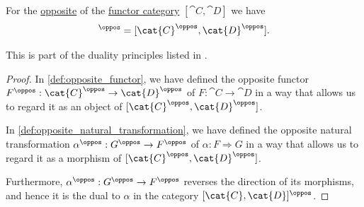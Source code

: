 \begin{proposition}\label{thm:opposite_of_functor_category}
  For the \hyperref[def:opposite_category]{opposite} of the \hyperref[def:functor_category]{functor category} \( [\cat{C}, \cat{D}] \) we have
  \begin{equation*}
    [\cat{C}, \cat{D}]^\oppos = [\cat{C}^\oppos, \cat{D}^\oppos].
  \end{equation*}

  This is part of the duality principles listed in .
\end{proposition}
\begin{proof}
  In \cref{def:opposite_functor}, we have defined the opposite functor \( F^\oppos: \cat{C}^\oppos \to \cat{D}^\oppos \) of \( F: \cat{C} \to \cat{D} \) in a way that allows us to regard it as an object of \( [\cat{C}^\oppos, \cat{D}^\oppos] \).

  In \cref{def:opposite_natural_transformation}, we have defined the opposite natural transformation \( \alpha^\oppos: G^\oppos \to F^\oppos \) of \( \alpha: F \Rightarrow G \) in a way that allows us to regard it as a morphism of \( [\cat{C}^\oppos, \cat{D}^\oppos] \).

  Furthermore, \( \alpha^\oppos: G^\oppos \to F^\oppos \) reverses the direction of its morphisms, and hence it is the dual to \( \alpha \) in the category \( [\cat{C}, \cat{D}]^\oppos \).
\end{proof}


